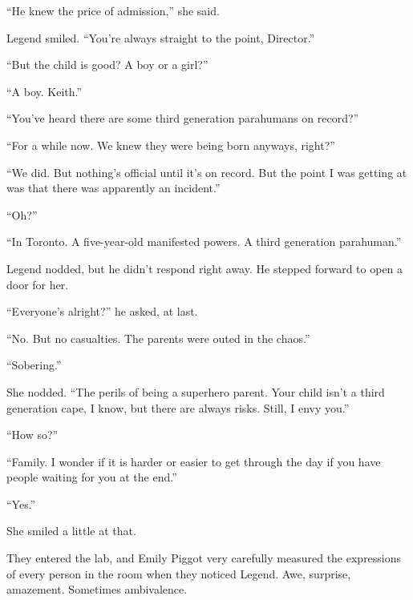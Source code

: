 ``He knew the price of admission,'' she said.



Legend smiled.  ``You're always straight to the point, Director.''



``But the child is good?  A boy or a girl?''



``A boy.  Keith.''



``You've heard there are some third generation parahumans on record?''



``For a while now.  We knew they were being born anyways, right?''



``We did.  But nothing's official until it's on record.  But the point I was getting at was that there was apparently an incident.''



``Oh?''



``In Toronto.  A five-year-old manifested powers.  A third generation parahuman.''



Legend nodded, but he didn't respond right away.  He stepped forward to open a door for her.



``Everyone's alright?'' he asked, at last.



``No.  But no casualties.  The parents were outed in the chaos.''



``Sobering.''



She nodded.  ``The perils of being a superhero parent.  Your child isn't a third generation cape, I know, but there are always risks.  Still, I envy you.''



``How so?''



``Family.  I wonder if it is harder or easier to get through the day if you have people waiting for you at the end.''



``Yes.''



She smiled a little at that.



They entered the lab, and Emily Piggot very carefully measured the expressions of every person in the room when they noticed Legend.  Awe, surprise, amazement.  Sometimes ambivalence.



